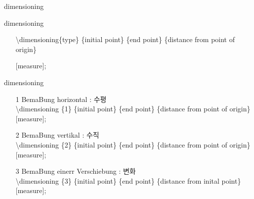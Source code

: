 \documentclass[ aspectratio=169,  12pt,blue,xcolor=pdftex,dvipsnames,table,handout,notes]{beamer}
\begin{document}

		\begin{frame}[t]{dimensioning}
 
				\begin{block}{dimensioning}
					\begin{itemize}
					\item[] \textbackslash dimensioning\{type\}
										\{initial point\}
										\{end point\}
										\{distance from point of origin\}
							\par \hspace{2cm} [measure];
					\end{itemize}
					\end{block}
		
					\begin{block}{dimensioning}
					\begin{itemize}
					\item[1] BemaBung horizontal : 수평 \\
							\textbackslash dimensioning		\{1\}
														\{initial point\}
														\{end point\}
														\{distance from point of origin\}
														[measure];
					\item[2] BemaBung vertikal : 수직 \\
							\textbackslash dimensioning		\{2\}						
														\{initial point\}
														\{end point\}
														\{distance from point of origin\}
														[measure];
					\item[3] BemaBung einerr Verschiebung : 변화 \\
							\textbackslash dimensioning		\{3\}
														\{initial point\}
														\{end point\}
														\{distance from inital point\}
														[measure];
					\end{itemize}
				\end{block}




				\begin{example}
				\end{example}

			\end{frame}
\end{document}
